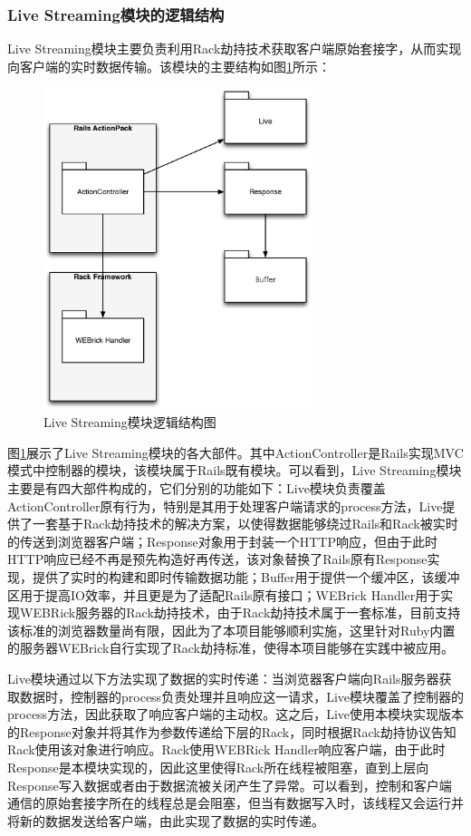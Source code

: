 \subsubsection{Live Streaming模块的逻辑结构}
Live Streaming模块主要负责利用Rack劫持技术获取客户端原始套接字，从而实现向客户端的实时数据传输。该模块的主要结构如图\ref{fig-live}所示：

\begin{figure}[h]
\centering
\includegraphics[width=0.7\textwidth]{images/overview/live_streaming.eps}
\caption{Live Streaming模块逻辑结构图}
\label{fig-live}
\end{figure}

图\ref{fig-live}展示了Live Streaming模块的各大部件。其中ActionController是Rails实现MVC模式中控制器的模块，该模块属于Rails既有模块。可以看到，Live Streaming模块主要是有四大部件构成的，它们分别的功能如下：Live模块负责覆盖ActionController原有行为，特别是其用于处理客户端请求的process方法，Live提供了一套基于Rack劫持技术的解决方案，以使得数据能够绕过Rails和Rack被实时的传送到浏览器客户端；Response对象用于封装一个HTTP响应，但由于此时HTTP响应已经不再是预先构造好再传送，该对象替换了Rails原有Response实现，提供了实时的构建和即时传输数据功能；Buffer用于提供一个缓冲区，该缓冲区用于提高IO效率，并且更是为了适配Rails原有接口；WEBrick Handler用于实现WEBRick服务器的Rack劫持技术，由于Rack劫持技术属于一套标准，目前支持该标准的浏览器数量尚有限，因此为了本项目能够顺利实施，这里针对Ruby内置的服务器WEBrick自行实现了Rack劫持标准，使得本项目能够在实践中被应用。

Live模块通过以下方法实现了数据的实时传递：当浏览器客户端向Rails服务器获取数据时，控制器的process负责处理并且响应这一请求，Live模块覆盖了控制器的process方法，因此获取了响应客户端的主动权。这之后，Live使用本模块实现版本的Response对象并将其作为参数传递给下层的Rack，同时根据Rack劫持协议告知Rack使用该对象进行响应。Rack使用WEBRick Handler响应客户端，由于此时Response是本模块实现的，因此这里使得Rack所在线程被阻塞，直到上层向Response写入数据或者由于数据流被关闭产生了异常。可以看到，控制和客户端通信的原始套接字所在的线程总是会阻塞，但当有数据写入时，该线程又会运行并将新的数据发送给客户端，由此实现了数据的实时传递。


